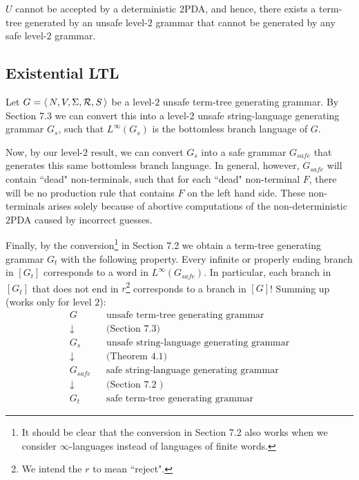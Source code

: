 \begin{conjecture} $U$ cannot be accepted by a deterministic
$2$PDA, and hence, there exists a term-tree generated by an unsafe
level-$2$ grammar that cannot be generated by any safe level-$2$
grammar.
\end{conjecture}

\subsection{Existential LTL}

Let $G = \langle\,{N, V, \Sigma, {\cal R}, S}\,\rangle$ be a level-$2$
unsafe term-tree generating grammar. By Section 7.3 we can convert
this into a level-$2$ unsafe string-language generating grammar
$G_s$, such that ${L^\infty}(G_s)$ is the bottomless branch
language of $G$.

Now, by our level-$2$ result, we can convert $G_s$ into a safe
grammar $G_{safe}$ that generates this same bottomless branch
language. In general, however, $G_{safe}$ will contain ``dead"
non-terminals, such that for each ``dead" non-terminal $F$, there
will be no production rule that contains $F$ on the left hand
side. These non-terminals arises solely because of abortive
computations of the non-deterministic $2$PDA caused by incorrect
guesses.

Finally, by the conversion\footnote{It should be clear that the
conversion in Section 7.2 also works when we consider
$\infty$-languages instead of languages of finite words.} in
Section 7.2 we obtain a term-tree generating grammar $G_t$ with
the following property. Every infinite or properly ending branch
in $[G_t]$ corresponds to a word in $L^\infty(G_{safe})$. In
particular, each branch in $[G_t]$ that does not end in
$r$\footnote{We intend the $r$ to mean ``reject".}
corresponds to a branch in $[G]$! Summing up (works only for level $2$):\\

\begin{eqnarray}
\nonumber G & & \mbox{unsafe term-tree generating grammar} \\
\nonumber \downarrow & & \mbox{(Section 7.3)}\\
\nonumber G_s &  &\mbox{unsafe string-language generating grammar} \\
\nonumber \downarrow & & \mbox{(Theorem 4.1)}\\
\nonumber G_{safe} & &  \mbox{safe string-language generating grammar} \\
\nonumber \downarrow & & \mbox{(Section 7.2 )}\\
\nonumber G_t & & \mbox{safe term-tree generating grammar}
\end{eqnarray}

